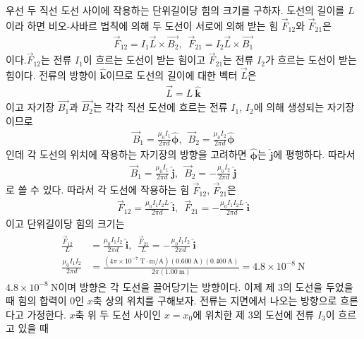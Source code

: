 \documentclass[tightenlines,floatfix,nofootinbib,superscriptaddress,fleqn]{revtex4}
\begin{document}
우선 두 직선 도선 사이에 작용하는 단위길이당 힘의 크기를 구하자. 도선의 길이를 $L$이라 하면
비오-사바르 법칙에 의해 두 도선이 서로에 의해 받는 힘 $\vec{F}_{12}$와 $\vec{F}_{21}$은
\begin{align}
  \vec{F}_{12} = I_1\vec{L}\times \vec{B_2},\,\,\,
  \vec{F}_{21} = I_2\vec{L}\times \vec{B_1}
\end{align}
이다.$\vec{F}_{12}$는 전류 $I_1$이 흐르는 도선이 받는 힘이고 $\vec{F}_{21}$는
전류 $I_2$가 흐르는 도선이 받는 힘이다.  전류의 방향이
$\hat{\bm k}$이므로 도선의 길이에 대한 벡터 $\vec{L}$은
\begin{align}
  \vec{L} = L~\hat{\bm k}
\end{align}
이고 자기장 $\vec{B_1}$과 $\vec{B_2}$는 각각 직선 도선에 흐르는 전류 $I_1$, $I_2$에 
의해 생성되는 자기장이므로
\begin{align}
  \vec{B}_1 =  \frac{\mu_0 I_1}{2\pi d}\hat{\bm \phi},\,\,\,
  \vec{B}_2 =  \frac{\mu_0 I_2}{2\pi d}\hat{\bm \phi}
\end{align}
인데 각 도선의 위치에 작용하는 자기장의 방향을 고려하면 $\hat{\bm \phi}$는 
$\hat{\bm j}$에 평행하다. 따라서
\begin{align}
  \vec{B}_1 =  \frac{\mu_0 I_1}{2\pi d}~\hat{\bm j},\,\,\,
  \vec{B}_2 =  -\frac{\mu_0 I_2}{2\pi d}~\hat{\bm j}
\end{align} 
로 쓸 수 있다. 따라서 각 도선에 작용하는 힘 $\vec{F}_{12}$, $\vec{F}_{21}$은
\begin{align}
  \vec{F}_{12} = \frac{\mu_0I_1 I_2 L}{2\pi d}~\hat{\bm i}
  ,\,\,\,
  \vec{F}_{21} = -\frac{\mu_0I_1 I_2 L}{2\pi d}~\hat{\bm i}
\end{align}
이고 단위길이당 힘의 크기는
\begin{align}
  \begin{split}
    \frac{\vec{F}_{12}}{L} &= \frac{\mu_0I_1 I_2 }{2\pi d}~\hat{\bm i}
    ,\,\,\,
    \frac{\vec{F}_{21}}{L} = -\frac{\mu_0I_1 I_2 }{2\pi d}~\hat{\bm i} \\
    \frac{\mu_0I_1 I_2 }{2\pi d} &= \frac{(4\pi\times 10^{-7}~\mathrm{T\cdot m/A})
    (0.600~\mathrm{A}) (0.400~\mathrm{A}) }{2\pi (1.00~\mathrm{m})}
    =4.8\times 10^{-8}~\mathrm{N}
  \end{split}
\end{align}
$4.8\times 10^{-8}~\mathrm{N}$이며 방향은 각 도선을 끌어당기는 방향이다. 이제 제 3의 도선을 
두었을 때 힘의 합력이 $0$인 $x$축 상의 위치를 구해보자. 전류는 지면에서 나오는 방향으로 흐른다고
가정한다. $x$축 위 두 도선 사이인 $x=x_0$에 위치한 제 3의 도선에 전류 $I_3$이 흐르고 있을 때 
\end{document}
